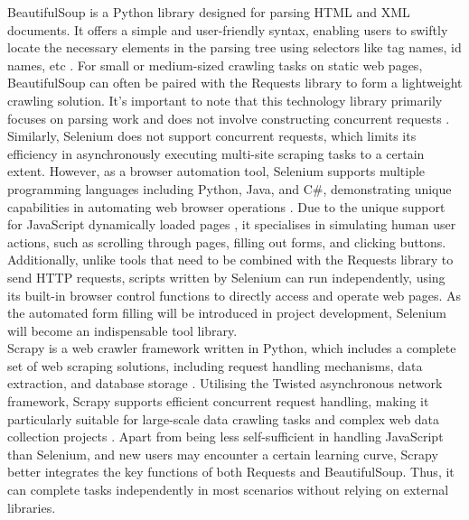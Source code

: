 \documentclass[ oneside,%
                    author={Cassie Qing Tang},
                    degree={BSc},
                     title={The Report for 3D Modelling of Queens Library \\ },
                    subtitle={ }]{dissertation}
\begin{document}
BeautifulSoup is a Python library designed for parsing HTML and XML documents. It offers a simple and user-friendly syntax, enabling users to swiftly locate the necessary elements in the parsing tree using selectors like tag names, id names, etc \cite{chandra_python_2015}. For small or medium-sized crawling tasks on static web pages, BeautifulSoup can often be paired with the Requests library to form a lightweight crawling solution. It's important to note that this technology library primarily focuses on parsing work and does not involve constructing concurrent requests \cite{fariha_beautifulsoup_2023}.
\\

Similarly, Selenium does not support concurrent requests, which limits its efficiency in asynchronously executing multi-site scraping tasks to a certain extent. However, as a browser automation tool, Selenium supports multiple programming languages including Python, Java, and C\#, demonstrating unique capabilities in automating web browser operations \cite{fariha_beautifulsoup_2023}. Due to the unique support for JavaScript dynamically loaded pages \cite{fariha_beautifulsoup_2023}, it specialises in simulating human user actions, such as scrolling through pages, filling out forms, and clicking buttons. Additionally, unlike tools that need to be combined with the Requests library to send HTTP requests, scripts written by Selenium can run independently, using its built-in browser control functions to directly access and operate web pages. As the automated form filling will be introduced in project development, Selenium will become an indispensable tool library.
\\

Scrapy is a web crawler framework written in Python, which includes a complete set of web scraping solutions, including request handling mechanisms, data extraction, and database storage \cite{noauthor_intro_nodate}. Utilising the Twisted asynchronous network framework, Scrapy supports efficient concurrent request handling, making it particularly suitable for large-scale data crawling tasks and complex web data collection projects \cite{noauthor_intro_nodate}. Apart from being less self-sufficient in handling JavaScript than Selenium, and new users may encounter a certain learning curve, Scrapy better integrates the key functions of both Requests and BeautifulSoup. Thus, it can complete tasks independently in most scenarios without relying on external libraries.
\\
\end{document}
